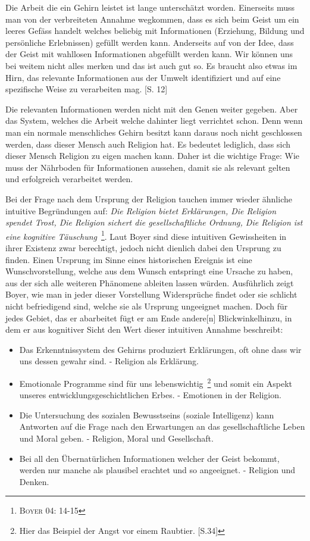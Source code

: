 Die Arbeit die ein Gehirn leistet ist lange unterschätzt worden. Einerseits muss man von der verbreiteten Annahme wegkommen, dass es sich beim Geist um ein leeres Gefäss handelt welches beliebig mit Informationen (Erziehung, Bildung und persönliche Erlebnissen) gefüllt werden kann. Anderseits auf von der Idee, dass der Geist mit wahllosen Informationen abgefüllt werden kann. Wir können uns bei weitem nicht alles merken und das ist auch gut so. Es braucht also etwas im Hirn, das relevante Informationen aus der Umwelt identifiziert und auf eine spezifische Weise zu verarbeiten mag. [S. 12]

Die relevanten Informationen werden nicht mit den Genen weiter gegeben. Aber das System, welches die Arbeit welche dahinter liegt verrichtet schon. Denn wenn man ein normale menschliches Gehirn besitzt kann daraus noch nicht geschlossen werden, dass dieser Mensch auch Religion hat. Es bedeutet lediglich, dass sich dieser Mensch Religion zu eigen machen kann. Daher ist die wichtige Frage: Wie muss der Nährboden für Informationen aussehen, damit sie als relevant gelten und erfolgreich verarbeitet werden. 

Bei der Frage nach dem Ursprung der Religion tauchen immer wieder ähnliche intuitive Begründungen auf: \emph{Die Religion bietet Erklärungen, Die Religion spendet Trost, Die Religion sichert die gesellschaftliche Ordnung, Die Religion ist eine kognitive Täuschung}~\footnote{\textsc{Boyer 04: 14-15}}. Laut Boyer sind diese intuitiven Gewissheiten in ihrer Existenz zwar berechtigt, jedoch nicht dienlich dabei den Ursprung zu finden. Einen Ursprung im Sinne eines historischen Ereignis ist eine Wunschvorstellung, welche aus dem Wunsch entspringt eine Ursache zu haben, aus der sich alle weiteren Phänomene ableiten lassen würden. Ausführlich zeigt Boyer, wie man in jeder dieser Vorstellung Widersprüche findet oder sie schlicht nicht befriedigend sind, welche sie als Ursprung ungeeignet machen. Doch für jedes Gebiet, das er abarbeitet fügt er am Ende \glqq[einen] andere[n] Blickwinkel\grqq  hinzu, in dem er aus kognitiver Sicht den Wert dieser intuitiven Annahme beschreibt:

\begin{itemize}
	\item Das Erkenntnissystem des Gehirns produziert Erklärungen, oft ohne dass wir uns dessen gewahr sind. - Religion als Erklärung.
	\item Emotionale Programme sind für uns lebenswichtig~\footnote{Hier das Beispiel der Angst vor einem Raubtier. [S.34]} und somit ein Aspekt unseres entwicklungsgeschichtlichen Erbes. - Emotionen in der Religion.
	\item Die Untersuchung des sozialen Bewusstseins (soziale Intelligenz) kann Antworten auf die Frage nach den Erwartungen an das gesellschaftliche Leben und Moral geben. - Religion, Moral und Gesellschaft.
	\item Bei all den Übernatürlichen Informationen welcher der Geist bekommt, werden nur manche als plausibel erachtet und so angeeignet. - Religion und Denken.
\end{itemize}

